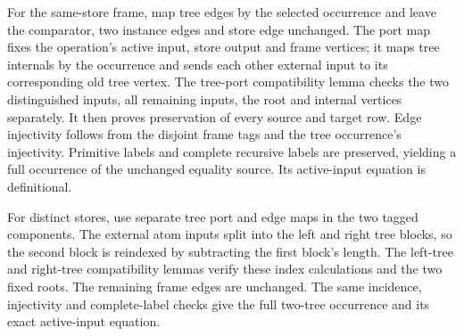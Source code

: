 For the same-store frame, map tree edges by the selected occurrence and
leave the comparator, two instance edges and store edge unchanged. The port
map fixes the operation's active input, store output and frame vertices;
it maps tree internals by the occurrence and sends each other external input
to its corresponding old tree vertex. The tree-port compatibility lemma
checks the two distinguished inputs, all remaining inputs, the root and
internal vertices separately. It then proves preservation of every source
and target row. Edge injectivity follows from the disjoint frame tags and
the tree occurrence's injectivity. Primitive labels and complete recursive
labels are preserved, yielding a full occurrence of the unchanged equality
source. Its active-input equation is definitional.
\par{}
\par{}
For distinct stores, use separate tree port and edge maps in the two tagged
components. The external atom inputs split into the left and right tree
blocks, so the second block is reindexed by subtracting the first block's
length. The left-tree and right-tree compatibility lemmas verify these
index calculations and the two fixed roots. The remaining frame edges
are unchanged. The same incidence, injectivity and complete-label checks
give the full two-tree occurrence and its exact active-input equation.
\par{}
\par{}
